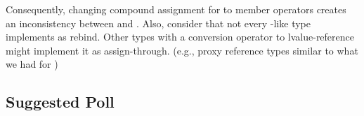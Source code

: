 Consequently, changing compound assignment for  to member operators creates an
inconsistency between  and .
Also, consider that not every -like type implements  as
rebind.
Other types with a conversion operator to lvalue-reference might implement it as assign-through.
(e.g., proxy reference types similar to what we had for )

\subsection{Suggested Poll}


